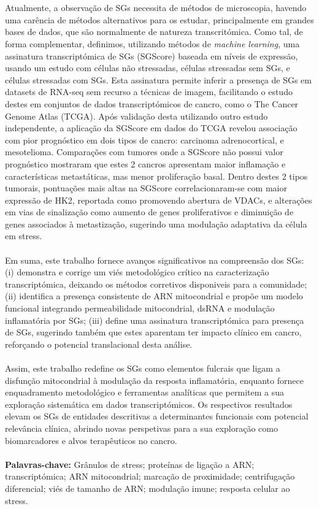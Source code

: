  \\
 \\
 Atualmente, a observação de SGs necessita de métodos de microscopia\cite{glauninger_stressful_2022}, havendo uma carência de métodos alternativos para os estudar, principalmente em grandes bases de dados, que são normalmente de natureza transcritómica. Como tal, de forma complementar, definimos, utilizando métodos de \textit{machine learning}, uma assinatura transcriptómica de SGs (SGScore) baseada em níveis de expressão, usando um estudo com células não stressadas, células stressadas sem SGs, e células stressadas com SGs. Esta assinatura permite inferir a presença de SGs em datasets de RNA-seq sem recurso a técnicas de imagem, facilitando o estudo destes em conjuntos de dados transcriptómicos de cancro, como o The Cancer Genome Atlas (TCGA)\cite{network_cancer_nodate, heath_nci_2021}. Após validação desta utilizando outro estudo independente, a aplicação da SGScore em dados do TCGA revelou associação com pior prognóstico em dois tipos de cancro: carcinoma adrenocortical, e mesotelioma. 
 Comparações com tumores onde a SGScore não possui valor prognóstico mostraram que estes 2 cancros apresentam maior inflamação e características metastáticas, mas menor proliferação basal. Dentro destes 2 tipos tumorais, pontuações mais altas na SGScore correlacionaram-se com maior expressão de HK2, reportada como promovendo abertura de VDACs\cite{haloi_structural_2021}, e alterações em vias de sinalização como aumento de genes proliferativos e diminuição de genes associados à metastização, sugerindo uma modulação adaptativa da célula em stress.
 \\
 \\
 Em suma, este trabalho fornece avanços significativos na compreensão dos SGs: (i) demonstra e corrige um viés metodológico crítico na caracterização transcriptómica, deixando os métodos corretivos disponiveis para a comunidade; (ii) identifica a presença consistente de ARN mitocondrial e propõe um modelo funcional integrando permeabilidade mitocondrial, dsRNA e modulação inflamatória por SGs; (iii) define uma assinatura transcriptómica para presença de SGs, sugerindo também que estes aparentam ter impacto clínico em cancro, reforçando o potencial translacional desta análise. 
 \\
 \\
Assim, este trabalho redefine os SGs como elementos fulcrais que ligam a disfunção mitocondrial à modulação da resposta inflamatória, enquanto fornece enquadramento metodológico e ferramentas analíticas que permitem a sua exploração sistemática em dados transcriptómicos. Os respectivos resultados elevam os SGs de entidades descritivas a determinantes funcionais com potencial relevância clínica, abrindo novas perspetivas para a sua exploração como biomarcadores e alvos terapêuticos no cancro.
\\
\\
\textbf{Palavras-chave:} Grânulos de stress; proteínas de ligação a ARN; transcriptómica; ARN mitocondrial; marcação de proximidade; centrifugação diferencial; viés de tamanho de ARN; modulação imune; resposta celular ao stress.

